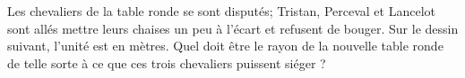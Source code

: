 
Les chevaliers de la table ronde se sont disputés; Tristan, Perceval et Lancelot sont allés mettre leurs chaises un peu à l'écart et refusent de bouger. Sur le dessin suivant, l'unité est en mètres. Quel doit être le rayon de la nouvelle table ronde de telle sorte à ce que ces trois chevaliers puissent siéger ?

\begin{center}
   
\end{center}
